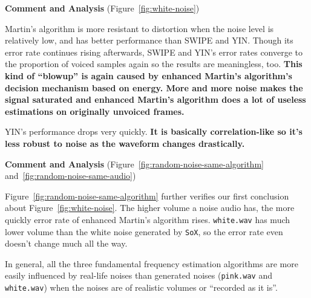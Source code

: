 \documentclass[11pt,a4paper]{report}
\begin{document}
\begin{mdframed}
\textbf{Comment and Analysis} (Figure~\ref{fig:white-noise})

\bigskip

Martin's algorithm is more resistant to distortion when the noise level is relatively low, and has better performance than SWIPE and YIN\@.
Though its error rate continues rising afterwards, SWIPE and YIN's error rates converge to the proportion of voiced samples again so the results are meaningless, too.
\textbf{This kind of \enquote{blowup} is again caused by enhanced Martin's algorithm's decision mechanism based on energy.
More and more noise makes the signal saturated and enhanced Martin's algorithm does a lot of useless estimations on originally unvoiced frames.}

\bigskip

YIN's performance drops very quickly.
\textbf{It is basically correlation-like so it's less robust to noise as the waveform changes drastically.}
\end{mdframed}

\begin{mdframed}
\textbf{Comment and Analysis} (Figure~\ref{fig:random-noise-same-algorithm} and~\ref{fig:random-noise-same-audio})

\bigskip

Figure~\ref{fig:random-noise-same-algorithm} further verifies our first conclusion about Figure~\ref{fig:white-noise}.
The higher volume a noise audio has, the more quickly error rate of enhanced Martin's algorithm rises.
\texttt{white.wav} has much lower volume than the white noise generated by \texttt{SoX}, so the error rate even doesn't change much all the way.

\bigskip

In general, all the three fundamental frequency estimation algorithms are more easily influenced by real-life noises than generated noises (\texttt{pink.wav} and \texttt{white.wav}) when the noises are of realistic volumes or \enquote{recorded as it is}.

\end{mdframed}
\end{document}
